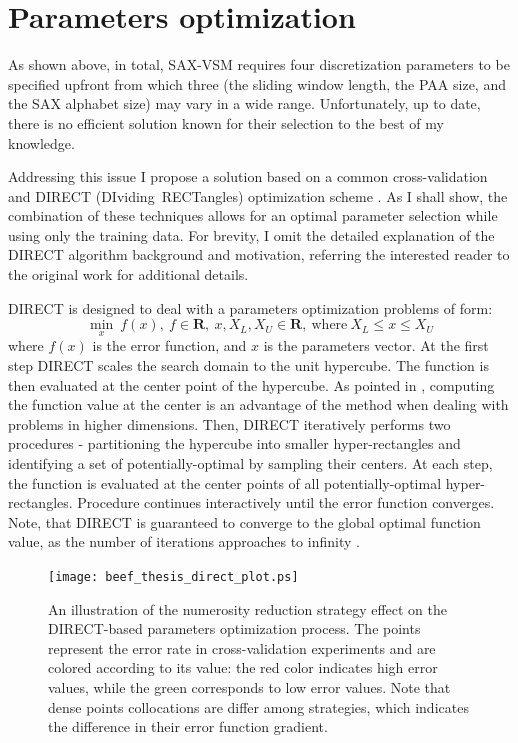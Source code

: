 \section{Parameters optimization} \label{section-direct}
As shown above, in total, SAX-VSM requires four discretization parameters to be specified upfront from which three 
(the sliding window length, the PAA size, and the SAX alphabet size) may vary in a wide range. 
Unfortunately, up to date, there is no efficient solution known for their selection to the best 
of my knowledge. 

Addressing this issue I propose a solution based on a common cross-validation and \mbox{DIRECT} \mbox{(DIviding RECTangles)} 
optimization scheme \cite{citeulike:4210208}. As I shall show, the combination of these techniques allows for 
an optimal parameter selection while using only the training data. For brevity, I omit the detailed explanation 
of the DIRECT algorithm background and motivation, referring the interested reader to the original work 
\cite{citeulike:12563460} for additional details.

DIRECT is designed to deal with a parameters optimization problems of form:
\begin{equation}
 \min_{x} \: f(x), \: f \in \mathbf{R}, \: x, X_{L}, X_{U} \in \mathbf{R}, \: \text{where} \: X_{L} \leq x \leq X_{U}
 \label{formula:direct}
\end{equation} 
where $f(x)$ is the error function, and $x$ is the parameters vector.
At the first step DIRECT scales the search domain to the unit hypercube. The function is then evaluated 
at the center point of the hypercube. As pointed in \cite{citeulike:12563460}, computing the function value
at the center is an advantage of the method when dealing with problems
in higher dimensions.
Then, DIRECT iteratively performs two procedures - partitioning the hypercube into smaller hyper-rectangles 
and identifying a set of potentially-optimal by sampling their centers. At each step, the function is evaluated 
at the center points of all potentially-optimal hyper-rectangles. Procedure continues interactively until the 
error function converges. Note, that DIRECT is guaranteed to converge to the global optimal function value,
as the number of iterations approaches to infinity \cite{citeulike:12563460}.

\begin{figure}[!t]
   \centering
   \texttt{[image: beef\_thesis\_direct\_plot.ps]}
   \caption{
   An illustration of the numerosity reduction strategy effect on the DIRECT-based parameters optimization process. 
   The points represent the error rate in cross-validation experiments and are colored according to its value: 
   the red color indicates high error values, while the green corresponds to low error values. 
   Note that dense points collocations are differ among strategies, which indicates the difference in their error 
   function gradient.
   }
   \label{fig:sax_nr}
\end{figure}

